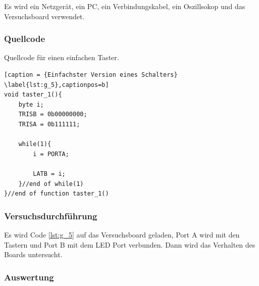 \documentclass[12pt,a4paper]{article}
\begin{document}
Es wird ein Netzgerät, ein PC, ein Verbindungskabel, ein Oszillsokop und das Versuchsboard verwendet.

\subsubsection*{Quellcode}

Quellcode für einen einfachen Taster.

\lstset{language=C, basicstyle=\tiny}
\begin{lstlisting}[caption = {Einfachster Version eines Schalters} \label{lst:g_5},captionpos=b]
void taster_1(){
	byte i;
	TRISB = 0b00000000;
	TRISA = 0b111111;
	
	while(1){
		i = PORTA;
		
		LATB = i;
	}//end of while(1)
}//end of function taster_1()
\end{lstlisting}

\subsubsection*{Versuchsdurchführung}

Es wird Code \ref{lst:g_5} auf das Versuchsboard geladen, Port A wird mit den Tastern und Port B mit dem LED Port verbunden. Dann wird das Verhalten des Boards untersucht.

\subsubsection*{Auswertung}
\end{document}
